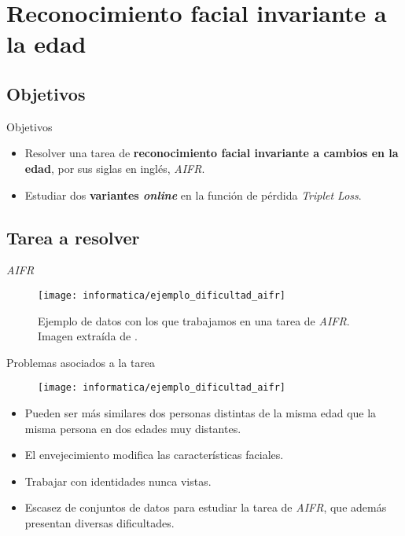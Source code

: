 \section{Reconocimiento facial invariante a la edad}

\subsection{Objetivos}
\begin{frame}{Objetivos}

	\begin{itemize}
		\item Resolver una tarea de \textbf{reconocimiento facial invariante a cambios en la edad}, por sus siglas en inglés, \textit{AIFR}.
	\end{itemize}

	\begin{itemize}
		\item Estudiar dos \textbf{variantes \textit{online}} en la función de pérdida \textit{Triplet Loss}.
	\end{itemize}

\end{frame}

\subsection{Tarea a resolver}

\begin{frame}{\textit{AIFR}}

	\begin{figure}
		\texttt{[image: informatica/ejemplo\_dificultad\_aifr]}
		\caption{Ejemplo de datos con los que trabajamos en una tarea de \textit{AIFR}. Imagen extraída de .}
		\label{img:ejemplo_dificultad_aifr}
	\end{figure}

\end{frame}

\begin{frame}{Problemas asociados a la tarea}

	\begin{figure}
		\texttt{[image: informatica/ejemplo\_dificultad\_aifr]}
	\end{figure}

	\begin{itemize}
		\item Pueden ser más similares dos personas distintas de la misma edad que la misma persona en dos edades muy distantes.
		\item El envejecimiento modifica las características faciales.
		\item Trabajar con identidades nunca vistas.
		\item Escasez de conjuntos de datos para estudiar la tarea de \textit{AIFR}, que además presentan diversas dificultades.
	\end{itemize}

\end{frame}

